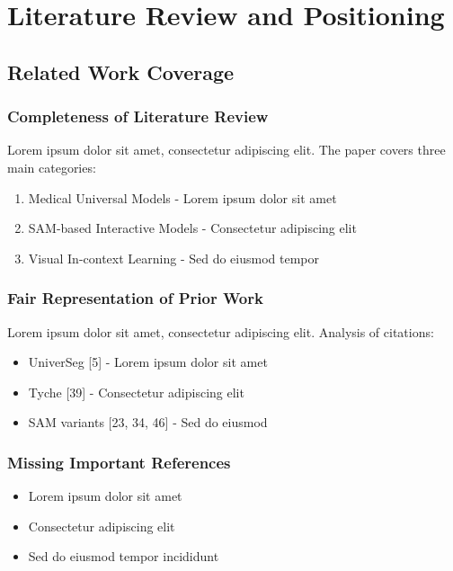 \section*{Literature Review and Positioning}
\label{sec:literature_review}

\subsection{Related Work Coverage}
\subsubsection{Completeness of Literature Review}
Lorem ipsum dolor sit amet, consectetur adipiscing elit. The paper covers three main categories:
\begin{enumerate}
    \item Medical Universal Models - Lorem ipsum dolor sit amet
    \item SAM-based Interactive Models - Consectetur adipiscing elit
    \item Visual In-context Learning - Sed do eiusmod tempor
\end{enumerate}


\subsubsection{Fair Representation of Prior Work}
Lorem ipsum dolor sit amet, consectetur adipiscing elit. Analysis of citations:
\begin{itemize}
    \item UniverSeg [5] - Lorem ipsum dolor sit amet
    \item Tyche [39] - Consectetur adipiscing elit
    \item SAM variants [23, 34, 46] - Sed do eiusmod
\end{itemize}

\subsubsection{Missing Important References}
\begin{itemize}
    \item Lorem ipsum dolor sit amet
    \item Consectetur adipiscing elit
    \item Sed do eiusmod tempor incididunt
\end{itemize}

